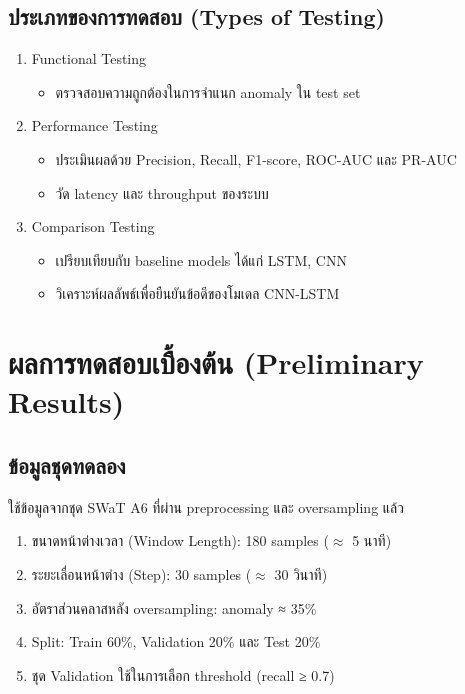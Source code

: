 \subsection{ประเภทของการทดสอบ (Types of Testing)}
\begin{enumerate}
    \item Functional Testing
    \begin{itemize}
        \item ตรวจสอบความถูกต้องในการจำแนก anomaly ใน test set
    \end{itemize}
    \item Performance Testing
    \begin{itemize}
        \item ประเมินผลด้วย Precision, Recall, F1-score, ROC-AUC และ PR-AUC
        \item วัด latency และ throughput ของระบบ
    \end{itemize}
    \item Comparison Testing
    \begin{itemize}
        \item เปรียบเทียบกับ baseline models ได้แก่ LSTM, CNN
        \item วิเคราะห์ผลลัพธ์เพื่อยืนยันข้อดีของโมเดล CNN-LSTM
    \end{itemize}
\end{enumerate}

\section{ผลการทดสอบเบื้องต้น (Preliminary Results)}

\subsection{ข้อมูลชุดทดลอง}
\hspace{2em} ใช้ข้อมูลจากชุด SWaT A6 ที่ผ่าน preprocessing และ oversampling แล้ว

\begin{enumerate}
    \item ขนาดหน้าต่างเวลา (Window Length): 180 samples ($\approx$ 5 นาที)
    \item ระยะเลื่อนหน้าต่าง (Step): 30 samples ($\approx$ 30 วินาที)
    \item อัตราส่วนคลาสหลัง oversampling: anomaly ≈ 35\%
    \item Split: Train 60\%, Validation 20\% และ Test 20\%
    \item ชุด Validation ใช้ในการเลือก threshold (recall ≥ 0.7)

\end{enumerate}
\newpage
